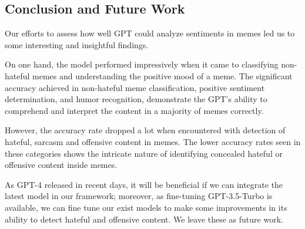 \documentclass[conference]{IEEEtran}
\begin{document}
\subsection{Conclusion and Future Work}
Our efforts to assess how well GPT could analyze sentiments in memes led us to some interesting and insightful findings. 

On one hand, the model performed impressively when it came to classifying non-hateful memes and understanding the positive mood of a meme. The significant accuracy achieved in non-hateful meme classification, positive sentiment determination, and humor recognition, demonstrate the GPT's ability to comprehend and interpret the content in a majority of memes correctly.

However, the accuracy rate dropped a lot when encountered with detection of hateful, sarcasm and offensive content in memes. The lower accuracy rates seen in these categories shows the intricate nature of identifying concealed hateful or offensive content inside memes.

As GPT-4 released in recent days, it will be beneficial if we can integrate the latest model in our framework; moreover, as fine-tuning GPT-3.5-Turbo is available, we can fine tune our exist models to make some improvements in its ability to detect hateful and offensive content. We leave these as future work. 










%
%
\end{document}
